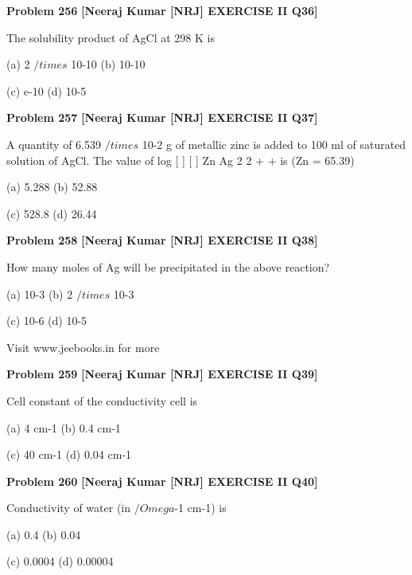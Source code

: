 \begin{problembox}
\textbf{Problem 256} \hfill \textbf{[Neeraj Kumar [NRJ] EXERCISE II Q36]}
\label{q:ext-nrj_all_questions-256}

The solubility product of AgCl at 298 K is
 
 (a) 2 $/times$ 10-10 
(b) 10-10
 
 (c) e-10 
(d) 10-5
\end{problembox}

\begin{problembox}
\textbf{Problem 257} \hfill \textbf{[Neeraj Kumar [NRJ] EXERCISE II Q37]}
\label{q:ext-nrj_all_questions-257}

A quantity of 6.539 $/times$ 10-2 g of metallic 
zinc is added to 100 ml of saturated solution of 
AgCl. The value of log [
]
[
]
Zn
Ag
2
2
+
+
 is (Zn = 65.39)
 
 (a) 5.288 
(b) 52.88
 
 (c) 528.8 
(d) 26.44
\end{problembox}

\begin{problembox}
\textbf{Problem 258} \hfill \textbf{[Neeraj Kumar [NRJ] EXERCISE II Q38]}
\label{q:ext-nrj_all_questions-258}

How many moles of Ag will be precipitated in the 
above reaction?
 
 (a) 10-3 
(b) 2 $/times$ 10-3
 
 (c) 10-6 
(d) 10-5
 
 
Visit www.jeebooks.in for more
\end{problembox}

\begin{problembox}
\textbf{Problem 259} \hfill \textbf{[Neeraj Kumar [NRJ] EXERCISE II Q39]}
\label{q:ext-nrj_all_questions-259}

Cell constant of the conductivity cell is
 
 (a) 4 cm-1 
(b) 0.4 cm-1
 
 (c) 40 cm-1 
(d) 0.04 cm-1
\end{problembox}

\begin{problembox}
\textbf{Problem 260} \hfill \textbf{[Neeraj Kumar [NRJ] EXERCISE II Q40]}
\label{q:ext-nrj_all_questions-260}

Conductivity of water (in  $/Omega$-1 cm-1) is
 
 (a) 0.4 
(b) 0.04
 
 (c) 0.0004 
(d) 0.00004
\end{problembox}

